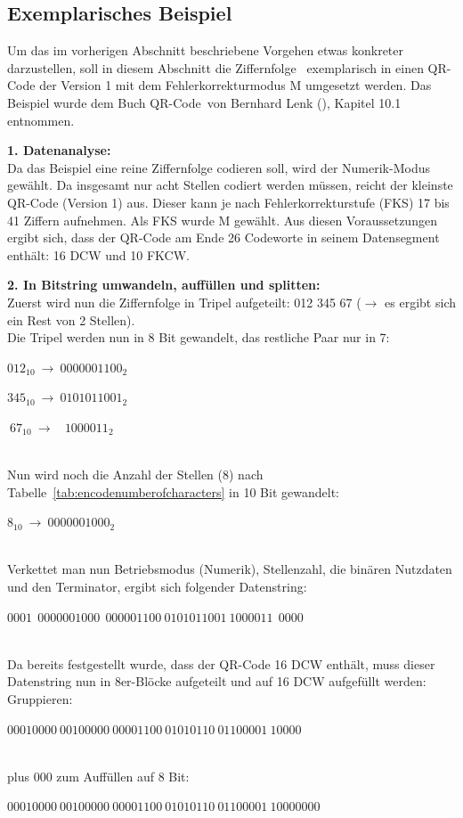 \subsection{Exemplarisches Beispiel}
Um das im vorherigen Abschnitt beschriebene Vorgehen etwas konkreter darzustellen, soll in diesem Abschnitt die Ziffernfolge \grqq~exemplarisch in einen QR-Code der Version 1 mit dem Fehlerkorrekturmodus M umgesetzt werden. Das Beispiel wurde dem Buch \glqq QR-Code\grqq~von Bernhard Lenk (\cite{Lenk2012}), Kapitel 10.1 entnommen.

\textbf{1. Datenanalyse:}\\
Da das Beispiel eine reine Ziffernfolge codieren soll, wird der Numerik-Modus gewählt. Da insgesamt nur acht Stellen codiert werden müssen, reicht der kleinste QR-Code (Version 1) aus. Dieser kann je nach Fehlerkorrekturstufe (FKS) 17 bis 41 Ziffern aufnehmen. Als FKS wurde M gewählt. Aus diesen Voraussetzungen ergibt sich, dass der QR-Code am Ende 26 Codeworte in seinem Datensegment enthält: 16 DCW und 10 FKCW. 

\textbf{2. In Bitstring umwandeln, auffüllen und splitten:}\\
Zuerst wird nun die Ziffernfolge in Tripel aufgeteilt: 012 345 67 ($\rightarrow$ es ergibt sich ein Rest von 2 Stellen).\\
Die Tripel werden nun in 8 Bit gewandelt, das restliche Paar nur in 7: \\
\centerline{$012_{10}~\rightarrow~0000001100_2$}
\centerline{$345_{10}~\rightarrow~0101011001_2$}
\centerline{$~67_{10}~\rightarrow~~~~1000011_2$}\\
Nun wird noch die Anzahl der Stellen (8) nach Tabelle~\ref{tab:encodenumberofcharacters} in 10 Bit gewandelt:~\\
\centerline{$8_{10}~\rightarrow~0000001000_2$}\\
Verkettet man nun Betriebsmodus (Numerik), Stellenzahl, die binären Nutzdaten und den Terminator, ergibt sich folgender Datenstring:~\\
\centerline{$0001~~0000001000~~000001100~0101011001~1000011~~0000$}\\
Da bereits festgestellt wurde, dass der QR-Code 16 DCW enthält, muss dieser Datenstring nun in 8er-Blöcke aufgeteilt und auf 16 DCW aufgefüllt werden:\\
Gruppieren:\\
\centerline{$00010000~00100000~00001100~01010110~01100001~10000$}\\
plus 000 zum Auffüllen auf 8 Bit:\\
\centerline{$00010000~00100000~00001100~01010110~01100001~10000000$}\\

